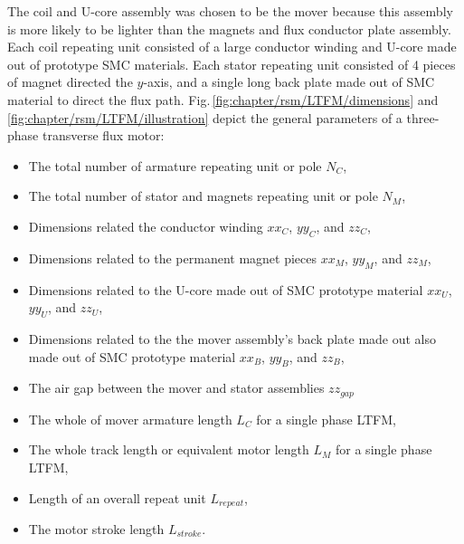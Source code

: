        
         The coil and U-core assembly was chosen to be the mover because this assembly is more likely to be lighter than the magnets and flux conductor plate assembly. Each coil repeating unit consisted of a large conductor winding and U-core made out of prototype \acs{SMC} materials. Each stator repeating unit consisted of 4 pieces of magnet directed the $y$-axis, and a single long back plate made out of \acs{SMC} material to direct the flux path. Fig.\,\ref{fig:chapter/rsm/LTFM/dimensions} and \ref{fig:chapter/rsm/LTFM/illustration} depict the general parameters of a three-phase transverse flux motor:
        
        \begin{itemize}
            \item The total number of armature repeating unit or pole $N_C$,
            \item The total number of stator and magnets repeating unit or pole $N_M$,
            \item Dimensions related the conductor winding $xx_C$, $yy_C$, and $zz_C$,
            \item Dimensions related to the permanent magnet pieces $xx_M$, $yy_M$, and $zz_M$,
            \item Dimensions related to the U-core made out of \acs{SMC} prototype material $xx_U$, $yy_U$, and $zz_U$,
            \item Dimensions related to the the mover assembly's back plate made out also made out of \acs{SMC} prototype material $xx_B$, $yy_B$, and $zz_B$,
            \item The air gap between the mover and stator assemblies  $zz_{gap}$
            \item The whole of mover armature length $L_{C}$ for a single phase \acs{LTFM},
            \item The whole track length or equivalent motor length $L_{M}$ for a single phase \acs{LTFM},
            \item Length of an overall repeat unit $L_{repeat}$,
            \item The motor stroke length $L_{stroke}$.
        \end{itemize}
        
